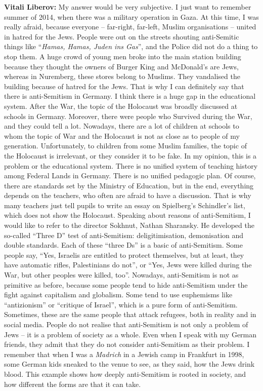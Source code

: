 \textbf{Vitali Liberov:} My answer would be very subjective. I just want to remember summer of 2014, when there was a military operation in Gaza. At this time, I was really afraid, because everyone – far-right, far-left, Muslim organisations – united in hatred for the Jews. People were out on the streets shouting anti-Semitic things like ``\textit{Hamas, Hamas, Juden ins Gas}'', and the Police did not do a thing to stop them. A huge crowd of young men broke into the main station building because they thought the owners of Burger King and McDonald’s are Jews, whereas in Nuremberg, these stores belong to Muslims. They vandalised the building because of hatred for the Jews. That is why I can definitely say that there is anti-Semitism in Germany. I think there is a huge gap in the educational system. After the War, the topic of the Holocaust was broadly discussed at schools in Germany. Moreover, there were people who Survived during the War, and they could tell a lot. Nowadays, there are a lot of children at schools to whom the topic of War and the Holocaust is not as close as to people of my generation. Unfortunately, to children from some Muslim families, the topic of the Holocaust is irrelevant, or they consider it to be fake. In my opinion, this is a problem or the educational system. There is no unified system of teaching history among Federal Lands in Germany. There is no unified pedagogic plan. Of course, there are standards set by the Ministry of Education, but in the end, everything depends on the teachers, who  often are afraid to have a discussion. That is why many teachers just tell pupils to write an essay on Spielberg’s Schindler’s list, which does not show the Holocaust. Speaking about reasons of anti-Semitism, I would like to refer to the director Sokhnut, Nathan Sharansky. He developed the so-called ``Three D'' test of anti-Semitism: deligitimisation, demonisation and double standards. Each of these ``three Ds'' is a basic of anti-Semitism. Some people say, ``Yes, Israelis are entitled to protect themselves, but at least, they have automatic rifles, Palestinians do not'', or ``Yes, Jews were killed during the War, but other peoples were killed, too''. Nowadays, anti-Semitism is not as primitive as before, because some people tend to hide anti-Semitism under the fight against capitalism and globalism. Some tend to use euphemisms like ``antizionism'' or ``critique of Israel'', which is a pure form of anti-Semitism. Sometimes, these are the same people that attack refugees, both in reality and in social media. People do not realise that anti-Semitism is not only a problem of Jews – it is a problem of society as a whole. Even when I speak with my German friends, they admit that they do not consider anti-Semitism as their problem. I remember that when I was a \textit{Madrich} in a Jewish camp in Frankfurt in 1998, some German kids sneaked to the venue to see, as they said, how the Jews drink blood. This example shows how deeply anti-Semitism is rooted in society, and how different the forms are that it can take.  

